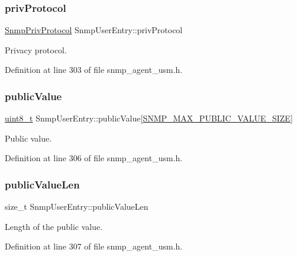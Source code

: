 \subsubsection{\texorpdfstring{priv\+Protocol}{privProtocol}}
{\footnotesize\ttfamily \hyperlink{snmp__agent__usm_8h_acfd97e4fdb0cd081855bcb3d922dd851}{Snmp\+Priv\+Protocol} Snmp\+User\+Entry\+::priv\+Protocol}



Privacy protocol. 



Definition at line 303 of file snmp\+\_\+agent\+\_\+usm.\+h.

\mbox{\label{structSnmpUserEntry_a40f5fdae184968aea77b0c816f341c8e}} 
\subsubsection{\texorpdfstring{public\+Value}{publicValue}}
{\footnotesize\ttfamily \hyperlink{stdint_8h_aba7bc1797add20fe3efdf37ced1182c5}{uint8\+\_\+t} Snmp\+User\+Entry\+::public\+Value\mbox{[}\hyperlink{snmp__common_8h_aa26659028607a40bdde3f48bb7e603e3}{S\+N\+M\+P\+\_\+\+M\+A\+X\+\_\+\+P\+U\+B\+L\+I\+C\+\_\+\+V\+A\+L\+U\+E\+\_\+\+S\+I\+ZE}\mbox{]}}



Public value. 



Definition at line 306 of file snmp\+\_\+agent\+\_\+usm.\+h.

\mbox{\label{structSnmpUserEntry_a5b818085df903f1065013380308c3777}} 
\subsubsection{\texorpdfstring{public\+Value\+Len}{publicValueLen}}
{\footnotesize\ttfamily size\+\_\+t Snmp\+User\+Entry\+::public\+Value\+Len}



Length of the public value. 



Definition at line 307 of file snmp\+\_\+agent\+\_\+usm.\+h.

